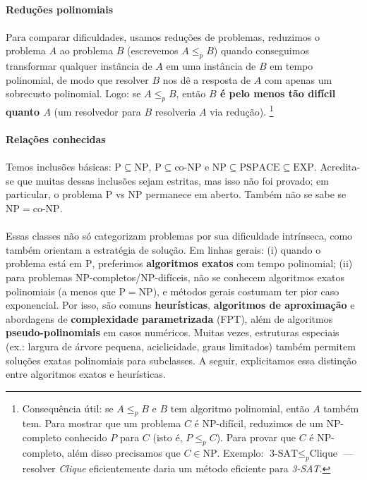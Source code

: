 \documentclass[12pt,a4paper]{article}
\def\emph#1{#1}%
\begin{document}
\paragraph{Reduções polinomiais}

\paragraph{}
Para comparar dificuldades, usamos reduções de problemas, reduzimos o problema \(A\) ao problema \(B\) (escrevemos \(A\le_p B\)) quando conseguimos transformar qualquer instância de \(A\) em uma instância de \(B\) em tempo polinomial, de modo que resolver \(B\) nos dê a resposta de \(A\) com apenas um sobrecusto polinomial. Logo: se \(A\le_p B\), então \textbf{\(B\) é pelo menos tão difícil quanto \(A\)} (um resolvedor para \(B\) resolveria \(A\) via redução). \footnote{Consequência útil: se \(A\le_p B\) e \(B\) tem algoritmo polinomial, então \(A\) também tem. Para mostrar que um problema \(C\) é NP-difícil, reduzimos \emph{de} um NP-completo conhecido \(P\) \emph{para} \(C\) (isto é, \(P\le_p C\)). Para provar que \(C\) é NP-completo, além disso precisamos que \(C\in\mathrm{NP}\). Exemplo: \(\text{3-SAT}\le_p \text{Clique}\) — resolver \textit{Clique} eficientemente daria um método eficiente para \textit{3-SAT}.}

\paragraph{Relações conhecidas}

\paragraph{}
Temos inclusões básicas: \(\mathrm{P}\subseteq \mathrm{NP}\), \(\mathrm{P}\subseteq \mathrm{co\text{-}NP}\) e \(\mathrm{NP}\subseteq \mathrm{PSPACE}\subseteq \mathrm{EXP}\). Acredita-se que muitas dessas inclusões sejam estritas, mas isso não foi provado; em particular, o problema \(\mathrm{P}\) vs \(\mathrm{NP}\) permanece em aberto. Também não se sabe se \(\mathrm{NP}=\mathrm{co\text{-}NP}\).

\paragraph{}
Essas classes não só categorizam problemas por sua dificuldade intrínseca, como também orientam a \emph{estratégia de solução}. Em linhas gerais: (i) quando o problema está em \(\mathrm{P}\), preferimos \textbf{algoritmos exatos} com tempo polinomial; (ii) para problemas NP-completos/NP-difíceis, \emph{não se conhecem} algoritmos exatos polinomiais (a menos que \(\mathrm{P}=\mathrm{NP}\)), e métodos gerais costumam ter pior caso exponencial. Por isso, são comuns \textbf{heurísticas}, \textbf{algoritmos de aproximação} e abordagens de \textbf{complexidade parametrizada} (FPT), além de algoritmos \textbf{pseudo-polinomiais} em casos numéricos. Muitas vezes, estruturas especiais (ex.: largura de árvore pequena, aciclicidade, graus limitados) também permitem soluções exatas polinomiais para subclasses. A seguir, explicitamos essa distinção entre \emph{algoritmos exatos} e \emph{heurísticas}.
\end{document}
